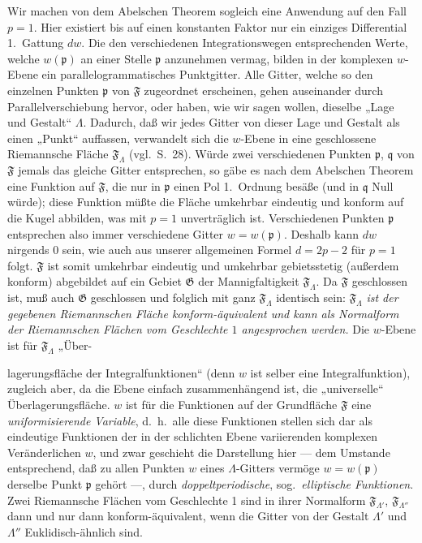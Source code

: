 \documentclass{article}
\begin{document}
Wir machen von dem Abelschen Theorem sogleich eine Anwendung auf den Fall $p = 1$. Hier existiert bis auf einen konstanten Faktor nur ein einziges Differential 1.\ Gattung $dw$. Die den verschiedenen Integrationswegen entsprechenden Werte, welche $w(\mathfrak{p})$ an einer Stelle $\mathfrak{p}$ anzunehmen vermag, bilden in der komplexen $w$-Ebene ein parallelogrammatisches Punktgitter. Alle Gitter, welche so den einzelnen Punkten $\mathfrak{p}$ von $\mathfrak{F}$ zugeordnet erscheinen, gehen auseinander durch Parallelverschiebung hervor, oder haben, wie wir sagen wollen, dieselbe „Lage und Gestalt“ $\Lambda$. Dadurch, daß wir jedes Gitter von dieser Lage und Gestalt als einen „Punkt“ auffassen, verwandelt sich die $w$-Ebene in eine geschlossene Riemannsche Fläche $\mathfrak{F}_\Lambda$ (vgl.\ S.~28). Würde zwei verschiedenen Punkten $\mathfrak{p}$, $\mathfrak{q}$ von $\mathfrak{F}$ jemals das gleiche Gitter entsprechen, so gäbe es nach dem Abelschen Theorem eine Funktion auf $\mathfrak{F}$, die nur in $\mathfrak{p}$ einen Pol 1.\ Ordnung besäße (und in $\mathfrak{q}$ Null würde); diese Funktion müßte die Fläche umkehrbar eindeutig und konform auf die Kugel abbilden, was mit $p = 1$ unverträglich ist. Verschiedenen Punkten $\mathfrak{p}$ entsprechen also immer verschiedene Gitter $w = w(\mathfrak{p})$. Deshalb kann $dw$ nirgends $0$ sein, wie auch aus unserer allgemeinen Formel $d = 2p - 2$ für $p = 1$ folgt. $\mathfrak{F}$ ist somit umkehrbar eindeutig und umkehrbar gebietsstetig (außerdem konform) abgebildet auf ein Gebiet $\mathfrak{G}$ der Mannigfaltigkeit $\mathfrak{F}_\Lambda$. Da $\mathfrak{F}$ geschlossen ist, muß auch $\mathfrak{G}$ geschlossen und folglich mit ganz $\mathfrak{F}_\Lambda$ identisch sein: $\mathfrak{F}_\Lambda$ \emph{ist der gegebenen Riemannschen Fläche konform-äquivalent und kann als Normalform der Riemannschen Flächen vom Geschlechte $1$ angesprochen werden.} Die $w$-Ebene ist für $\mathfrak{F}_\Lambda$ „Über-

lagerungsfläche der Integralfunktionen“ (denn $w$ ist selber eine Integralfunktion), zugleich aber, da die Ebene einfach zusammenhängend ist, die „universelle“ Überlagerungsfläche. $w$ ist für die Funktionen auf der Grundfläche $\mathfrak{F}$ eine \emph{uniformisierende Variable}, d.~h.\ alle diese Funktionen stellen sich dar als eindeutige Funktionen der in der schlichten Ebene variierenden komplexen Veränderlichen $w$, und zwar geschieht die Darstellung hier --- dem Umstande entsprechend, daß zu allen Punkten $w$ eines $\Lambda$-Gitters vermöge $w = w(\mathfrak{p})$ derselbe Punkt $\mathfrak{p}$ gehört ---, durch \emph{doppeltperiodische}, sog.\ \emph{elliptische Funktionen}. Zwei Riemannsche Flächen vom Geschlechte 1 sind in ihrer Normalform $\mathfrak{F}_{\Lambda'}$, $\mathfrak{F}_{\Lambda''}$ dann und nur dann konform-äquivalent, wenn die Gitter von der Gestalt $\Lambda'$ und $\Lambda''$ Euklidisch-ähnlich sind.
\end{document}

